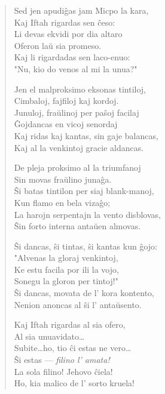\begin{verse}
                  Sed jen apudi\^gas jam Micpo la kara,\\
                    \vin    Kaj Iftah rigardas sen \^ceso:\\
                  Li devas ekvidi por dia altaro\\
                    \vin    Oferon la\u u sia promeso.\\
                  Kaj li rigardadas sen laco-enuo:\\
                  "Nu, kio do venos al mi la unua?"

                  Jen el malproksimo eksonas tintiloj,\\
                    \vin    Cimbaloj, fajfiloj kaj kordoj.\\
                  Junuloj, fra\u ulinoj per pa\^soj facilaj\\
                   \vin     \^Gojdancas en vicoj senordaj\\
                  Kaj ridas kaj kantas, sin gaje balancas,\\
                  Kaj al la venkintoj gracie aldancas.

                  De pleja proksimo al la triumfanoj\\
                   \vin     Sin movas fra\u ulino juna\^ga.\\
                  \^Si batas tintilon per siaj blank-manoj,\\
                   \vin     Kun flamo en bela viza\^go;\\
                  La harojn serpentajn la vento disblovas,\\
                  \^Sin forto interna anta\u uen almovas.

                  \^Si dancas, \^si tintas, \^si kantas kun \^gojo:\\
                   \vin     "Alvenas la gloraj venkintoj,\\
                  Ke estu facila por ili la vojo,\\
                   \vin     Sonegu la gloron per tintoj!"\\
                  \^Si dancas, movata de l' kora kontento,\\
                  Nenion anoncas al \^si l' anta\u usento.

                  Kaj Iftah rigardas al sia ofero,\\
                  \vin      Al sia unuavidato\dots\\
                  Subite\dots ho, tio \^ci estas ne vero\dots\\
                   \vin     \^Si estas --- {\sl filino l' amata!}\\
                  La sola filino! Jehovo \^ciela!\\
                  Ho, kia malico de l' sorto kruela!


\end{verse}
